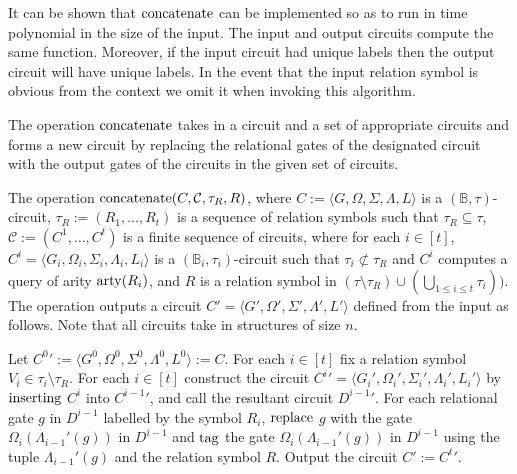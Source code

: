 \documentclass[../paper.tex]{subfiles}
\begin{document}



It can be shown that $\text{\upshape concatenate}$ can be implemented so as to run in time
polynomial in the size of the input. The input and output circuits compute the
same function. Moreover, if the input circuit had unique labels then the output
circuit will have unique labels. In the event that the input relation symbol is
obvious from the context we omit it when invoking this algorithm.

The operation $\text{\upshape concatenate}$ takes in a circuit and a set of appropriate
circuits and forms a new circuit by replacing the relational gates of the
designated circuit with the output gates of the circuits in the given set of
circuits.

\begin{definition}
  The operation $\text{\upshape concatenate}(C, \mathcal{C}, \tau_R, R)$, where $C :=
  \langle G, \Omega, \Sigma, \Lambda, L \rangle$ is a $(\mathbb{B},
  \tau)$-circuit, $\tau_R := (R_1, \ldots, R_t)$ is a sequence of relation
  symbols such that $\tau_R \subseteq \tau$, $\mathcal{C} := ( C^1, \ldots,
  C^t)$ is a finite sequence of circuits, where for each $i \in [t]$, $C^i =
  \langle G_i, \Omega_i, \Sigma_i, \Lambda_i, L_i \rangle$ is a $(\mathbb{B}_i,
  \tau_i)$-circuit such that $\tau_i \not\subset \tau_R$ and $C^i$ computes a
  query of arity $\mathrm{arty}(R_i)$, and $R$ is a relation symbol in $(\tau \setminus
  \tau_R) \cup (\bigcup_{1 \leq i \leq t}\tau_i))$. The operation outputs a
  circuit $C' = \langle G', \Omega', \Sigma', \Lambda', L' \rangle$ defined from
  the input as follows. Note that all circuits take in structures of size $n$.
  
  Let ${C^0}' := \langle G^0, \Omega^0, \Sigma^0, \Lambda^0, L^0 \rangle := C$.
  For each $i \in [t]$ fix a relation symbol $V_i \in \tau_i \setminus \tau_R$.
  For each $i \in [t]$ construct the circuit ${C^{i}}' = \langle G_i',
  \Omega_i', \Sigma_i', \Lambda_i', L_i' \rangle $ by $\text{\upshape inserting}$ $C^i$
  into ${C^{i-1}}'$, and call the resultant circuit ${D^{i-1}}'$. For each
  relational gate $g$ in $D^{i-1}$ labelled by the symbol $R_i$, $\text{\upshape replace}$
  $g$ with the gate $\Omega_{i}(\Lambda_{i-1}'(g))$ in $D^{i-1}$ and $\text{\upshape tag}$
  the gate $\Omega_i(\Lambda_{i-1}'(g))$ in $D^{i-1}$ using the tuple
  $\Lambda_{i-1}'(g)$ and the relation symbol $R$. Output the circuit $C' :=
  {C^t}'$.
\end{definition}
\end{document}
